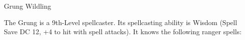 \begin{DndMonster}[width=0.5\textwidth]{Grung Wildling\label{monster:GrungWildling}}
	\begin{DndMonsterSpells}
		\item[Spellcasting] The Grung is a 9th-Level spellcaster. Its spellcasting ability is Wisdom (Spell Save DC 12, +4 to hit with spell attacks). It knows the following ranger spells:
	\end{DndMonsterSpells}
\end{DndMonster}